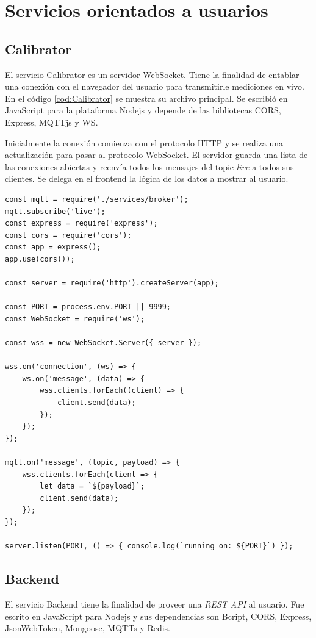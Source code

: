 \section{Servicios orientados a usuarios}

\subsection{Calibrator}
El servicio Calibrator es un servidor WebSocket.
Tiene la finalidad de entablar una conexión con el navegador del usuario para transmitirle mediciones en vivo.
En el código \ref{cod:Calibrator} se muestra su archivo principal.
Se escribió en JavaScript para la plataforma Nodejs y depende de las bibliotecas CORS, Express, MQTTjs y WS.

Inicialmente la conexión comienza con el protocolo HTTP y se realiza una actualización para pasar al protocolo WebSocket.
El servidor guarda una lista de las conexiones abiertas y reenvía todos los mensajes del topic \emph{live} a todos sus clientes.
Se delega en el frontend la lógica de los datos a mostrar al usuario.

\begin{lstlisting}[label=cod:Calibrator,caption=Archivo principal del servicio Calibrator]
const mqtt = require('./services/broker');
mqtt.subscribe('live');
const express = require('express');
const cors = require('cors');
const app = express();
app.use(cors());

const server = require('http').createServer(app);

const PORT = process.env.PORT || 9999;
const WebSocket = require('ws');

const wss = new WebSocket.Server({ server });

wss.on('connection', (ws) => {
    ws.on('message', (data) => {
        wss.clients.forEach((client) => {
            client.send(data);
        });
    });
});

mqtt.on('message', (topic, payload) => {
    wss.clients.forEach(client => {
        let data = `${payload}`;
        client.send(data);
    });
});

server.listen(PORT, () => { console.log(`running on: ${PORT}`) }); 
\end{lstlisting}

\subsection{Backend}
El servicio Backend tiene la finalidad de proveer una \emph{REST API} al usuario.
Fue escrito en JavaScript para Nodejs y sus dependencias son Bcript, CORS, Express, JsonWebToken, Mongoose, MQTTs y Redis.

